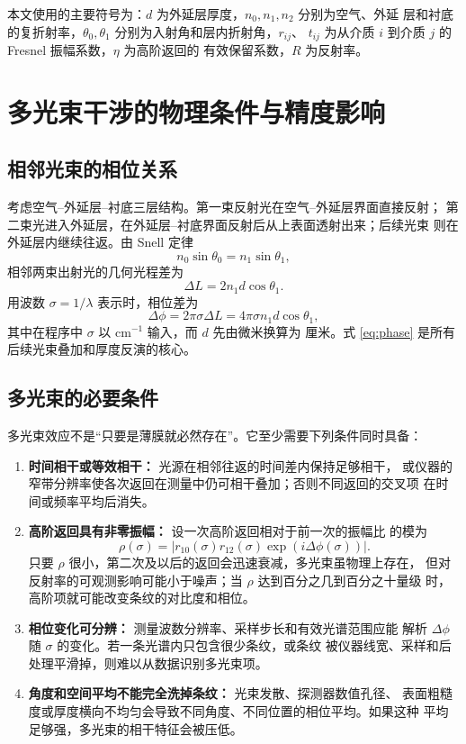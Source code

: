\documentclass[UTF8,12pt,a4paper]{ctexart}
\begin{document}
本文使用的主要符号为：$d$ 为外延层厚度，$n_0,n_1,n_2$ 分别为空气、外延
层和衬底的复折射率，$\theta_0,\theta_1$ 分别为入射角和层内折射角，$r_{ij}$、
$t_{ij}$ 为从介质 $i$ 到介质 $j$ 的 Fresnel 振幅系数，$\eta$ 为高阶返回的
有效保留系数，$R$ 为反射率。

\section{多光束干涉的物理条件与精度影响}

\subsection{相邻光束的相位关系}

考虑空气--外延层--衬底三层结构。第一束反射光在空气--外延层界面直接反射；
第二束光进入外延层，在外延层--衬底界面反射后从上表面透射出来；后续光束
则在外延层内继续往返。由 Snell 定律
\[
n_0\sin\theta_0=n_1\sin\theta_1,
\]
相邻两束出射光的几何光程差为
\[
\Delta L=2n_1d\cos\theta_1.
\]
用波数 $\sigma=1/\lambda$ 表示时，相位差为
\begin{equation}
  \Delta\phi=2\pi\sigma\Delta L
  =4\pi\sigma n_1d\cos\theta_1,
  \label{eq:phase}
\end{equation}
其中在程序中 $\sigma$ 以 $\mathrm{cm}^{-1}$ 输入，而 $d$ 先由微米换算为
厘米。式 \eqref{eq:phase} 是所有后续光束叠加和厚度反演的核心。

\subsection{多光束的必要条件}

多光束效应不是“只要是薄膜就必然存在”。它至少需要下列条件同时具备：

\begin{enumerate}[label=(\arabic*)]
  \item \textbf{时间相干或等效相干：} 光源在相邻往返的时间差内保持足够相干，
  或仪器的窄带分辨率使各次返回在测量中仍可相干叠加；否则不同返回的交叉项
  在时间或频率平均后消失。
  \item \textbf{高阶返回具有非零振幅：} 设一次高阶返回相对于前一次的振幅比
  的模为
  \begin{equation}
    \rho(\sigma)=\left|r_{10}(\sigma)r_{12}(\sigma)
    \exp\left(i\Delta\phi(\sigma)\right)\right|.
    \label{eq:rho}
  \end{equation}
  只要 $\rho$ 很小，第二次及以后的返回会迅速衰减，多光束虽物理上存在，
  但对反射率的可观测影响可能小于噪声；当 $\rho$ 达到百分之几到百分之十量级
  时，高阶项就可能改变条纹的对比度和相位。
  \item \textbf{相位变化可分辨：} 测量波数分辨率、采样步长和有效光谱范围应能
  解析 $\Delta\phi$ 随 $\sigma$ 的变化。若一条光谱内只包含很少条纹，或条纹
  被仪器线宽、采样和后处理平滑掉，则难以从数据识别多光束项。
  \item \textbf{角度和空间平均不能完全洗掉条纹：} 光束发散、探测器数值孔径、
  表面粗糙度或厚度横向不均匀会导致不同角度、不同位置的相位平均。如果这种
  平均足够强，多光束的相干特征会被压低。
\end{enumerate}
\end{document}
